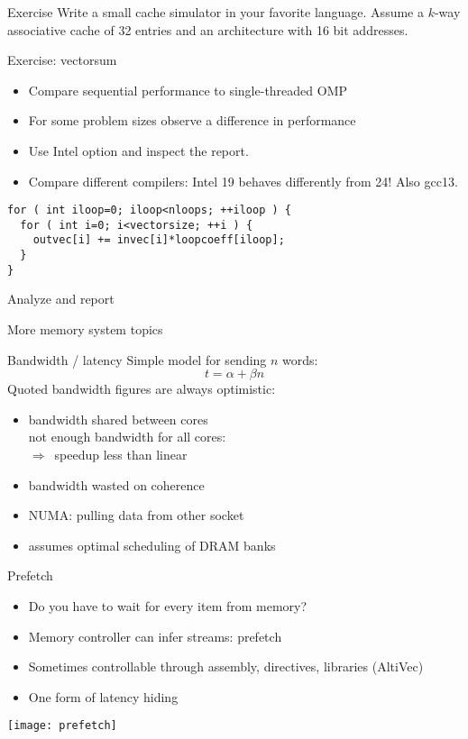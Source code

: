 \begin{numberedframe}{Exercise}
  Write a small cache simulator in your favorite language. Assume a
  $k$-way associative cache of 32 entries and an architecture with 16
  bit addresses.  
\end{numberedframe}

\begin{numberedframe}{Exercise: vectorsum}
  \begin{itemize}
  \item Compare sequential performance to single-threaded OMP
  \item For some problem sizes observe a difference in performance
  \item Use Intel option  and inspect the report.
  \item Compare different compilers: Intel 19 behaves differently from 24! Also gcc13.
  \end{itemize}
\begin{lstlisting}
for ( int iloop=0; iloop<nloops; ++iloop ) {
  for ( int i=0; i<vectorsize; ++i ) {
    outvec[i] += invec[i]*loopcoeff[iloop];
  }
}
\end{lstlisting}
Analyze and report
\end{numberedframe}

 {More memory system topics}

\begin{numberedframe}{Bandwidth / latency}
  Simple model for sending $n$ words: \[ t=\alpha + \beta n \]
  Quoted bandwidth figures are always optimistic:
  \begin{itemize}
  \item bandwidth shared between cores\\
    not enough bandwidth for all cores:\\
    $\Rightarrow$~speedup less than linear
  \item bandwidth wasted on coherence
  \item NUMA: pulling data from other socket
  \item assumes optimal scheduling of DRAM banks
  \end{itemize}
\end{numberedframe}

\begin{numberedframe}{Prefetch}
  \begin{itemize}
  \item Do you have to wait for every item from memory?
  \item Memory controller can infer streams: prefetch
  \item Sometimes controllable through assembly, directives, libraries (AltiVec)
  \item One form of latency hiding
  \end{itemize}
\texttt{[image: prefetch]}
\end{numberedframe}

